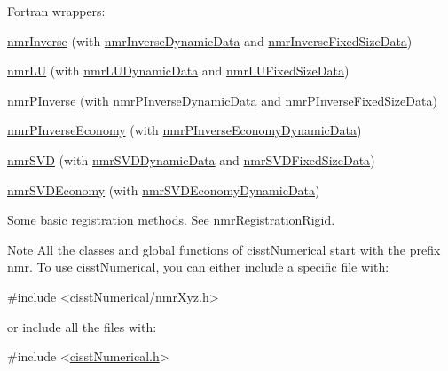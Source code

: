 \begin{DoxyItemize}
\begin{DoxyItemize}
\item Fortran wrappers\-: 
\begin{DoxyItemize}
\item \hyperlink{nmr_inverse_8h_a018d876444a46377abdd85e296643035}{nmr\-Inverse} (with \hyperlink{classnmr_inverse_dynamic_data}{nmr\-Inverse\-Dynamic\-Data} and \hyperlink{classnmr_inverse_fixed_size_data}{nmr\-Inverse\-Fixed\-Size\-Data}) 
\item \hyperlink{nmr_l_u_8h_a66bf403c705953a781e940cf1b674d5f}{nmr\-L\-U} (with \hyperlink{classnmr_l_u_dynamic_data}{nmr\-L\-U\-Dynamic\-Data} and \hyperlink{classnmr_l_u_fixed_size_data}{nmr\-L\-U\-Fixed\-Size\-Data}) 
\item \hyperlink{nmr_p_inverse_8h_a0694f8540c064c2aa6d8dbe488238462}{nmr\-P\-Inverse} (with \hyperlink{classnmr_p_inverse_dynamic_data}{nmr\-P\-Inverse\-Dynamic\-Data} and \hyperlink{classnmr_p_inverse_fixed_size_data}{nmr\-P\-Inverse\-Fixed\-Size\-Data}) 
\item \hyperlink{nmr_p_inverse_economy_8h_af93b2c1c9b8517e63053a1f6c18f8952}{nmr\-P\-Inverse\-Economy} (with \hyperlink{classnmr_p_inverse_economy_dynamic_data}{nmr\-P\-Inverse\-Economy\-Dynamic\-Data}) 
\item \hyperlink{nmr_s_v_d_8h_a52115d0e7a485c4494aa20f4f3f4ebe7}{nmr\-S\-V\-D} (with \hyperlink{classnmr_s_v_d_dynamic_data}{nmr\-S\-V\-D\-Dynamic\-Data} and \hyperlink{classnmr_s_v_d_fixed_size_data}{nmr\-S\-V\-D\-Fixed\-Size\-Data}) 
\item \hyperlink{nmr_s_v_d_economy_8h_a7a5496ff2d20946e8738baac82318603}{nmr\-S\-V\-D\-Economy} (with \hyperlink{classnmr_s_v_d_economy_dynamic_data}{nmr\-S\-V\-D\-Economy\-Dynamic\-Data}) 
\end{DoxyItemize}
\end{DoxyItemize}
\item Some basic registration methods. See nmr\-Registration\-Rigid.
\end{DoxyItemize}

\begin{DoxyNote}{Note}
All the classes and global functions of cisst\-Numerical start with the prefix nmr. To use cisst\-Numerical, you can either include a specific file with\-: 
\begin{DoxyCode}
\textcolor{preprocessor}{#include <cisstNumerical/nmrXyz.h>}
\end{DoxyCode}
 or include all the files with\-: 
\begin{DoxyCode}
\textcolor{preprocessor}{#include <\hyperlink{cisst_numerical_8h}{cisstNumerical.h}>}
\end{DoxyCode}
 
\end{DoxyNote}
